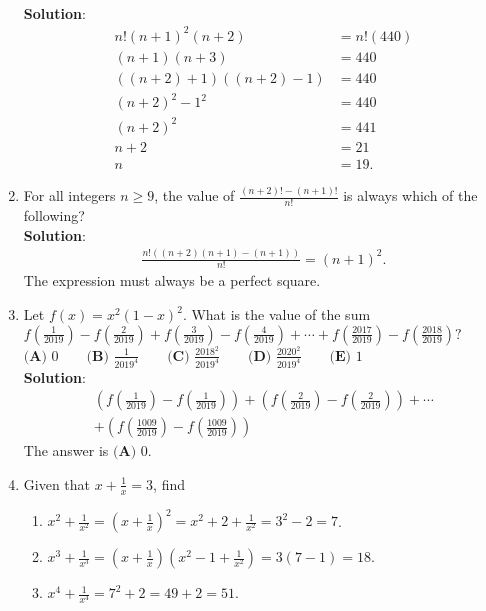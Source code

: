 \begin{enumerate}
  \\ \textbf{Solution}:
  \begin{align*}
    n!(n+1)^2(n+2) &= n!(440) \\
    (n+1)(n+3) &= 440 \\
    ((n+2)+1)((n+2)-1) &= 440 \\
    (n+2)^2-1^2 &= 440 \\
    (n+2)^2 &= 441 \\
    n + 2 &= 21 \\
    n &= \boxed{19}.
  \end{align*}
  \item For all integers $n \geq 9$, the value of $\frac{(n+2)! - (n+1)!}{n!}$ is always which of the following?
  \\ \textbf{Solution}:
  \begin{align*}
    \frac{n!((n+2)(n+1)-(n+1))}{n!} = (n+1)^2.
  \end{align*}
  The expression must always be a perfect square.
  \item Let $f(x) = x^{2}(1-x)^{2}$. What is the value of the sum
  $f \left(\frac{1}{2019} \right)-f  \left(\frac{2}{2019} \right)+f \left(\frac{3}{2019} \right)-f \left(\frac{4}{2019} \right)+\cdots + f \left(\frac{2017}{2019} \right) - f \left(\frac{2018}{2019} \right)?$
  \\ $\textbf{(A) }0\qquad\textbf{(B) }\frac{1}{2019^{4}}\qquad\textbf{(C) }\frac{2018^{2}}{2019^{4}}\qquad\textbf{(D) }\frac{2020^{2}}{2019^{4}}\qquad\textbf{(E) }1$
  \\ \textbf{Solution}:
  \begin{align*}
    \left( f \left(\frac{1}{2019} \right) - f \left(\frac{1}{2019} \right) \right) +  \left( f \left(\frac{2}{2019} \right) - f \left(\frac{2}{2019} \right) \right) + \cdots \\ + \left( f \left(\frac{1009}{2019} \right) - f \left(\frac{1009}{2019} \right) \right)
  \end{align*}
  The answer is $\boxed{\textbf{(A) }0}$.
  \item Given that $x+\frac{1}{x}=3$, find 
  \begin{enumerate}
    \item $x^2+\frac{1}{x^2} = (x + \frac{1}{x})^2 = x^2 + 2 + \frac{1}{x^2} = 3^2 - 2 = \boxed{7}$.
    \item $x^3 + \frac{1}{x^3} = (x+\frac{1}{x})(x^2-1+\frac{1}{x^2}) = 3(7-1)=\boxed{18}$.
    \item $x^4 + \frac{1}{x^4} = 7^2 + 2 = 49 + 2 = \boxed{51}$.
  \end{enumerate}

\end{enumerate}
